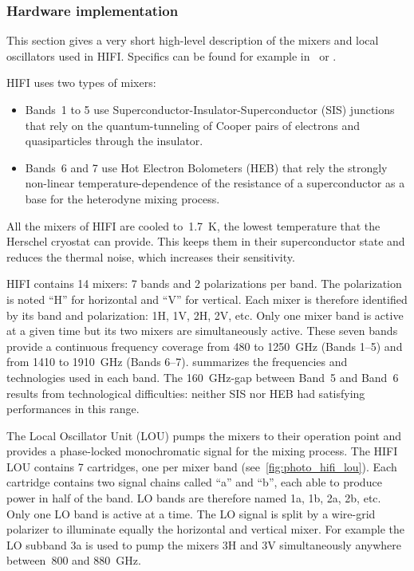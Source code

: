 \clearpage
\subsubsection{Hardware implementation}

This section gives a very short high-level description of the mixers and local oscillators used in HIFI.
Specifics can be found for example in~\textcites{pearson2000local}{pearson2003terahertz}{jackson2006low} or \textcite{kooi2008}.

\begin{samepage}
HIFI uses two types of mixers:
\begin{itemize}[noitemsep,nolistsep]
    \item Bands~1 to 5 use
Superconductor-Insulator-Superconductor (SIS) junctions that rely on the quantum-tunneling of Cooper pairs of electrons and quasiparticles through the insulator.
    \item Bands~6 and 7 use  Hot Electron Bolometers (HEB) that rely the strongly non-linear temperature-dependence of the resistance of a superconductor as a base for the heterodyne mixing process.
\end{itemize}
\end{samepage}

All the mixers of HIFI are cooled to~\SI{1.7}{\kelvin}, the lowest temperature that the Herschel cryostat can provide.
This keeps them in their superconductor state and reduces the thermal noise, which increases their sensitivity.

HIFI contains 14 mixers: 7 bands and 2 polarizations per band.
The polarization is noted ``H'' for horizontal and ``V'' for vertical.
Each mixer is therefore identified by its band and polarization: 1H, 1V, 2H, 2V, etc.
Only one mixer band is active at a given time but its two mixers are simultaneously active.
These seven bands provide a continuous frequency coverage from \num{480} to \SI{1250}{\giga\hertz} (Bands 1--5) and from \num{1410} to \SI{1910}{\giga\hertz} (Bands 6--7).
 summarizes the frequencies and technologies used in each band.
The \SI{160}{\giga\hertz}-gap between Band~5 and Band~6 results from technological difficulties: neither SIS nor HEB had satisfying performances in this range.

The Local Oscillator Unit (LOU) pumps the mixers to their operation point and provides a phase-locked monochromatic signal for the mixing process.
The HIFI LOU contains 7 cartridges, one per mixer band (see~\cref{fig:photo_hifi_lou}).
Each cartridge contains two signal chains called ``a'' and ``b'', each able to produce power in half of the band.
LO bands are therefore named 1a, 1b, 2a, 2b, etc.
Only one LO band is active at a time.
The LO signal is split by a wire-grid polarizer to illuminate equally the horizontal and vertical mixer.
For example the LO subband 3a is used to pump the mixers 3H and 3V simultaneously anywhere between~\num{800} and \SI{880}{\giga\hertz}.

